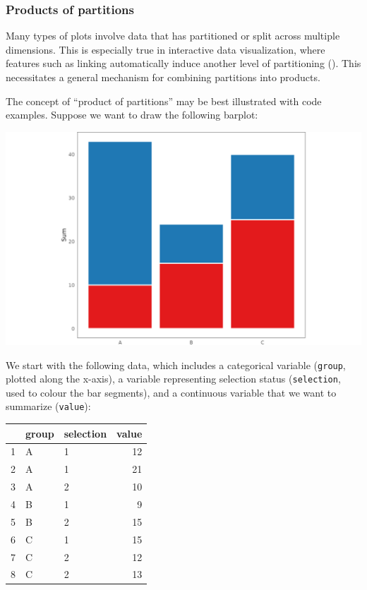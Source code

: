 \documentclass[
]{book}
\theoremstyle{definition}
\theoremstyle{definition}
\theoremstyle{definition}
\theoremstyle{definition}
\theoremstyle{remark}
\begin{document}
\subsubsection{Products of partitions}\label{products-of-partitions}

Many types of plots involve data that has partitioned or split across multiple dimensions. This is especially true in interactive data visualization, where features such as linking automatically induce another level of partitioning (). This necessitates a general mechanism for combining partitions into products.

The concept of ``product of partitions'' may be best illustrated with code examples. Suppose we want to draw the following barplot:

\begin{center}\includegraphics[width=1\linewidth,height=1\textheight]{./figures/barplot-partitions-products} \end{center}

We start with the following data, which includes a categorical variable (\texttt{group}, plotted along the x-axis), a variable representing selection status (\texttt{selection}, used to colour the bar segments), and a continuous variable that we want to summarize (\texttt{value}):

\begin{table}
\centering
\begin{tabular}{l|l|l|r}
\hline
  & group & selection & value\\
\hline
1 & A & 1 & 12\\
\hline
2 & A & 1 & 21\\
\hline
3 & A & 2 & 10\\
\hline
4 & B & 1 & 9\\
\hline
5 & B & 2 & 15\\
\hline
6 & C & 1 & 15\\
\hline
7 & C & 2 & 12\\
\hline
8 & C & 2 & 13\\
\hline
\end{tabular}
\end{table}
\end{document}
